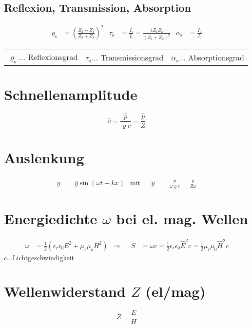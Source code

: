 \clearpage

		\subsection{Reflexion, Transmission, Absorption}
			\begin{align*}
				\varrho_{\mathrm{s}} &= \left(\frac{Z_2-Z_1}{Z_2+Z_1}\right)^2 
				& \tau_{\mathrm{s}} &= \frac{I_{\mathrm{t}}}{I_{\mathrm{e}}}= \frac{4Z_1Z_2}{(Z_1+Z_2)^2} 
				& \alpha_{\mathrm{s}} &= \frac{I_{\mathrm{a}}}{I_{\mathrm{e}}}
			\end{align*}

			\begin{table}[h]
			\begin{tabular}{lll}
			$\varrho_{\mathrm{s}}\dots$ Reflexionsgrad & $\tau_{\mathrm{s}}\dots$ Transmissionsgrad & $\alpha_{\mathrm{s}}\dots$ Absorptionsgrad\\
			\end{tabular}
			\end{table}
		
	\section{Schnellenamplitude}
		\[ \hat{v} = \frac{\hat{p}}{\varrho c } = \frac{\hat{p}}{Z} \]

	\section{Auslenkung}
		\begin{align*}
			y &= \hat{y} \sin(\omega t - kx) & \text{mit} && \hat{y} &= \frac{\hat{p}}{\omega \varrho c} = \frac{\hat{p}}{Z \omega}
		\end{align*}	

	\section{Energiedichte $\omega$ bei el. mag. Wellen}
		\begin{align*}
			\omega &= \frac12 ( \epsilon_r \epsilon_0 E^2 + \mu_r \mu_o H^2) &\Rightarrow && S &= \omega c = \frac12 \epsilon_r \epsilon_0 \hat{E}^2 c =  \frac12 \mu_r \mu_0 \hat{H}^2 c
		\end{align*}
		$c\dots$Lichtgeschwindigkeit

	\section{Wellenwiderstand $Z$ (el/mag)}
		\[Z = \frac{E}{H} \]

